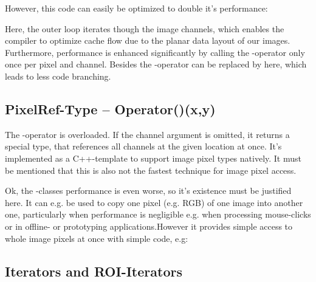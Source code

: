 
However, this code can easily be optimized to double it's performance:


Here, the outer loop iterates though the image channels, which enables the compiler to optimize cache flow due to the planar data layout of our images. Furthermore, performance is enhanced significantly by calling the -operator only once per pixel and channel. Besides the -operator can be replaced by  here, which leads to less code branching.

\subsection{PixelRef-Type -- Operator()(x,y)}

The \inlinecode{()}-operator is overloaded. If the channel argument is omitted, it returns a special   type, that references all channels at the given location at once. It's implemented as a C++-template to support image pixel types natively. It must be mentioned that this is also not the fastest technique for image pixel access.


Ok, the -classes performance is even worse, so it's existence must be justified here. It can e.g. be used to copy one pixel (e.g. RGB) of one image into another one, particularly when performance is negligible e.g. when processing mouse-clicks or in offline- or prototyping applications.However it provides simple access to whole image pixels at once with simple code, e.g: 



\subsection{Iterators and ROI-Iterators\label{sec:iterator-based-data-access}}

